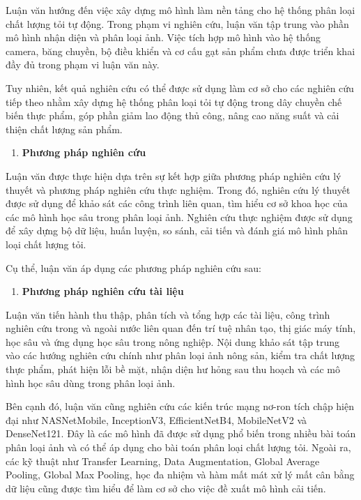 \documentclass[
]{article}
\begin{document}
Luận văn hướng đến việc xây dựng mô hình làm nền tảng cho hệ thống phân
loại chất lượng tỏi tự động. Trong phạm vi nghiên cứu, luận văn tập
trung vào phần mô hình nhận diện và phân loại ảnh. Việc tích hợp mô hình
vào hệ thống camera, băng chuyền, bộ điều khiển và cơ cấu gạt sản phẩm
chưa được triển khai đầy đủ trong phạm vi luận văn này.

Tuy nhiên, kết quả nghiên cứu có thể được sử dụng làm cơ sở cho các
nghiên cứu tiếp theo nhằm xây dựng hệ thống phân loại tỏi tự động trong
dây chuyền chế biến thực phẩm, góp phần giảm lao động thủ công, nâng cao
năng suất và cải thiện chất lượng sản phẩm.

\begin{enumerate}
\def\labelenumi{\arabic{enumi}.}
\setcounter{enumi}{3}
\item
  \protect{}\label{_Toc232111987}{}\textbf{Phương pháp
  nghiên cứu}
\end{enumerate}

Luận văn được thực hiện dựa trên sự kết hợp giữa phương pháp nghiên cứu
lý thuyết và phương pháp nghiên cứu thực nghiệm. Trong đó, nghiên cứu lý
thuyết được sử dụng để khảo sát các công trình liên quan, tìm hiểu cơ sở
khoa học của các mô hình học sâu trong phân loại ảnh. Nghiên cứu thực
nghiệm được sử dụng để xây dựng bộ dữ liệu, huấn luyện, so sánh, cải
tiến và đánh giá mô hình phân loại chất lượng tỏi.

Cụ thể, luận văn áp dụng các phương pháp nghiên cứu sau:

\begin{enumerate}
\def\labelenumi{\alph{enumi}.}
\item
  \textbf{Phương pháp nghiên cứu tài liệu}
\end{enumerate}

Luận văn tiến hành thu thập, phân tích và tổng hợp các tài liệu, công
trình nghiên cứu trong và ngoài nước liên quan đến trí tuệ nhân tạo, thị
giác máy tính, học sâu và ứng dụng học sâu trong nông nghiệp. Nội dung
khảo sát tập trung vào các hướng nghiên cứu chính như phân loại ảnh nông
sản, kiểm tra chất lượng thực phẩm, phát hiện lỗi bề mặt, nhận diện hư
hỏng sau thu hoạch và các mô hình học sâu dùng trong phân loại ảnh.

Bên cạnh đó, luận văn cũng nghiên cứu các kiến trúc mạng nơ-ron tích
chập hiện đại như NASNetMobile, InceptionV3, EfficientNetB4, MobileNetV2
và DenseNet121. Đây là các mô hình đã được sử dụng phổ biến trong nhiều
bài toán phân loại ảnh và có thể áp dụng cho bài toán phân loại chất
lượng tỏi. Ngoài ra, các kỹ thuật như Transfer Learning, Data
Augmentation, Global Average Pooling, Global Max Pooling, học đa nhiệm
và hàm mất mát xử lý mất cân bằng dữ liệu cũng được tìm hiểu để làm cơ
sở cho việc đề xuất mô hình cải tiến.
\end{document}
